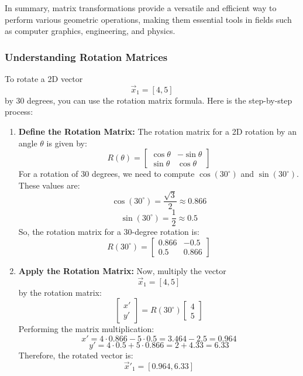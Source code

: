 \documentclass[11pt]{article}
\begin{document}
In summary, matrix transformations provide a versatile and efficient way
to perform various geometric operations, making them essential tools in
fields such as computer graphics, engineering, and physics.

    \hypertarget{understanding-rotation-matrices}{%
\subsubsection{\texorpdfstring{\textbf{Understanding Rotation
Matrices}}{Understanding Rotation Matrices}}\label{understanding-rotation-matrices}}

    To rotate a 2D vector \[\vec{x}_1 = [4, 5]\] by 30 degrees, you can use
the rotation matrix formula. Here is the step-by-step process:

\begin{enumerate}
\def\labelenumi{\arabic{enumi}.}
\item
  \textbf{Define the Rotation Matrix:} The rotation matrix for a 2D
  rotation by an angle \(\theta\) is given by: \[
  R(\theta) = \begin{bmatrix}
  \cos \theta & -\sin \theta \\
  \sin \theta & \cos \theta
  \end{bmatrix}
  \] For a rotation of 30 degrees, we need to compute \(\cos(30^\circ)\)
  and \(\sin(30^\circ)\). These values are: \[
  \cos(30^\circ) = \frac{\sqrt{3}}{2} \approx 0.866
  \] \[
  \sin(30^\circ) = \frac{1}{2} \approx 0.5
  \] So, the rotation matrix for a 30-degree rotation is: \[
  R(30^\circ) = \begin{bmatrix}
  0.866 & -0.5 \\
  0.5 & 0.866
  \end{bmatrix}
  \]
\item
  \textbf{Apply the Rotation Matrix:} Now, multiply the vector
  \[\vec{x}_1 = [4, 5]\] by the rotation matrix: \[
  \begin{bmatrix}
  x' \\ y'
  \end{bmatrix} = R(30^\circ) \begin{bmatrix}
  4 \\ 5
  \end{bmatrix}
  \] Performing the matrix multiplication: \[
  x' = 4 \cdot 0.866 - 5 \cdot 0.5 = 3.464 - 2.5 = 0.964
  \] \[
  y' = 4 \cdot 0.5 + 5 \cdot 0.866 = 2 + 4.33 = 6.33
  \] Therefore, the rotated vector is: \[
  \vec{x}'_1 = [0.964, 6.33]
  \]
\end{enumerate}
\end{document}
